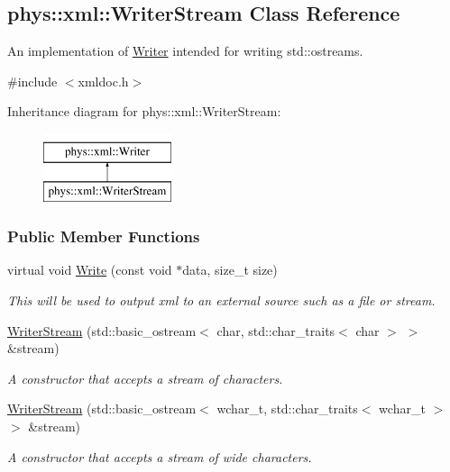 \hypertarget{classphys_1_1xml_1_1WriterStream}{
\subsection{phys::xml::WriterStream Class Reference}
\label{classphys_1_1xml_1_1WriterStream}
}


An implementation of \hyperlink{classphys_1_1xml_1_1Writer}{Writer} intended for writing std::ostreams.  




{\ttfamily \#include $<$xmldoc.h$>$}

Inheritance diagram for phys::xml::WriterStream:\begin{figure}[H]
\begin{center}
\leavevmode
\includegraphics[height=2.000000cm]{classphys_1_1xml_1_1WriterStream}
\end{center}
\end{figure}
\subsubsection*{Public Member Functions}
\begin{DoxyCompactItemize}
\item 
virtual void \hyperlink{classphys_1_1xml_1_1WriterStream_a743c3f41a010df17f54054031fdc4891}{Write} (const void $\ast$data, size\_\-t size)
\begin{DoxyCompactList}\small\item\em This will be used to output xml to an external source such as a file or stream. \item\end{DoxyCompactList}\item 
\hyperlink{classphys_1_1xml_1_1WriterStream_ae170ab7c429b6f7149d3540243329dfa}{WriterStream} (std::basic\_\-ostream$<$ char, std::char\_\-traits$<$ char $>$ $>$ \&stream)
\begin{DoxyCompactList}\small\item\em A constructor that accepts a stream of characters. \item\end{DoxyCompactList}\item 
\hyperlink{classphys_1_1xml_1_1WriterStream_aaebcd545af8e44cf6556a46077f0a366}{WriterStream} (std::basic\_\-ostream$<$ wchar\_\-t, std::char\_\-traits$<$ wchar\_\-t $>$ $>$ \&stream)
\begin{DoxyCompactList}\small\item\em A constructor that accepts a stream of wide characters. \item\end{DoxyCompactList}\end{DoxyCompactItemize}


